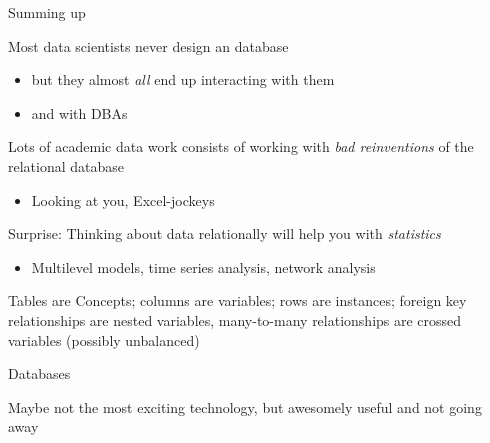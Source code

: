 \documentclass{hertieteaching}
\begin{document}
\begin{frame}{Summing up}
  
Most data scientists never design an database
\begin{itemize}
  \item but they almost \textit{all} end up interacting with them
  \item and with DBAs
\end{itemize}
Lots of academic data work consists of working with \textit{bad reinventions} of the relational database
\begin{itemize}
  \item Looking at you, Excel-jockeys
\end{itemize}
\pause
Surprise: Thinking about data relationally will help you with \textit{statistics}
\begin{itemize}
  \item Multilevel models, time series analysis, network analysis
\end{itemize}
Tables are Concepts; columns are variables; rows are instances; foreign key relationships are nested variables, many-to-many relationships are crossed variables (possibly unbalanced)

  
\end{frame}

\begin{frame}{Databases}

Maybe not the most exciting technology, but awesomely useful and not going away

\end{frame}
\end{document}
